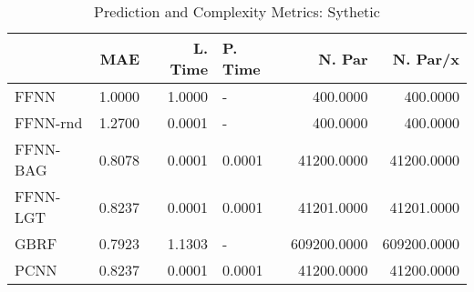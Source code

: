 \begin{table}
\centering
\caption{Prediction and Complexity Metrics: Sythetic}
\label{tab__Sythetic__Fix_Neurons_QTrue}
\begin{tabular}{lrrlrr}
\toprule
{} &    MAE &  L. Time & P. Time &      N. Par &    N. Par/x \\
\midrule
FFNN     & 1.0000 &   1.0000 &       - &    400.0000 &    400.0000 \\
FFNN-rnd & 1.2700 &   0.0001 &       - &    400.0000 &    400.0000 \\
FFNN-BAG & 0.8078 &   0.0001 &  0.0001 &  41200.0000 &  41200.0000 \\
FFNN-LGT & 0.8237 &   0.0001 &  0.0001 &  41201.0000 &  41201.0000 \\
GBRF     & 0.7923 &   1.1303 &       - & 609200.0000 & 609200.0000 \\
PCNN     & 0.8237 &   0.0001 &  0.0001 &  41200.0000 &  41200.0000 \\
\bottomrule
\end{tabular}
\end{table}
